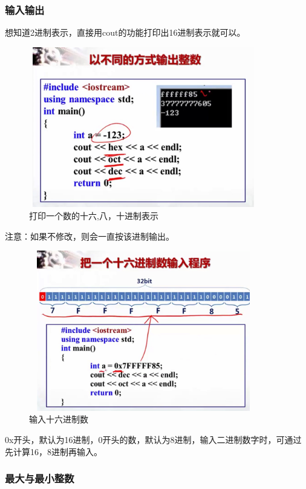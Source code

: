 \documentclass[UTF8]{article}
\begin{document}
\subsubsection{输入输出}
想知道2进制表示，直接用cout的功能打印出16进制表示就可以。
\begin{figure}[!htb]
\centering
\includegraphics[width=10cm,height=7cm]{16810present.jpg}
\caption{打印一个数的十六,八，十进制表示}
\hspace{0.05in}
\end{figure}

注意：如果不修改，则会一直按该进制输出。
\begin{figure}[!htb]
\centering
\includegraphics[width=10cm,height=7cm]{16input.jpg}
\caption{输入十六进制数}
\hspace{0.05in}
\end{figure}
0x开头，默认为16进制，0开头的数，默认为8进制，输入二进制数字时，可通过先计算16，8进制再输入。
\subsubsection{最大与最小整数}
\end{document}
